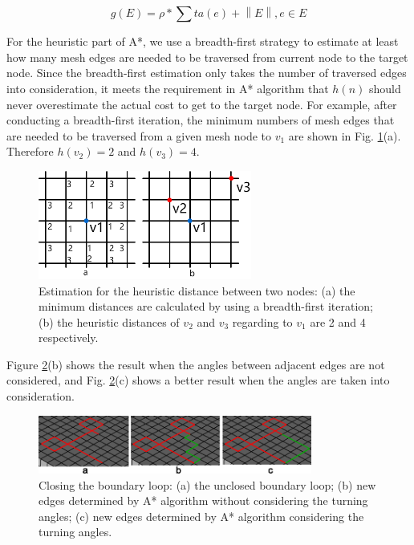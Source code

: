 \documentclass[final,5p,times,twocolumn]{elsarticle}
\begin{document}
\begin{equation}
\label{equ:det_part}
g(E) = \rho * \sum ta(e) + \left \| E \right \|, e \in E
\end{equation}

For the heuristic part of A*, we use a breadth-first strategy to estimate at least how many mesh edges are needed to be traversed from current node to the target node. Since the breadth-first estimation only takes the number of traversed edges into consideration, it meets the requirement in A* algorithm that $h(n)$ should never overestimate the actual cost to get to the target node. For example, after conducting a breadth-first iteration, the minimum numbers of mesh edges that are needed to be traversed from a given mesh node to $v_1$ are shown in Fig. \ref{fig:A_start_estimation}(a). Therefore $h(v_2)=2$ and $h(v_3)=4$.

\begin{figure}[htbp]
\begin{center}
\includegraphics[width=7cm]{A_start_estimation.png}
\caption{Estimation for the heuristic distance between two nodes: (a) the minimum distances are calculated by using a breadth-first iteration; (b) the heuristic distances of $v_2$ and $v_3$ regarding to $v_1$ are 2 and 4 respectively.}
\label{fig:A_start_estimation}
\end{center}
\end{figure}

Figure \ref{fig:close_loop}(b) shows the result when the angles between adjacent edges are not considered, and Fig. \ref{fig:close_loop}(c) shows a better result when the angles are taken into consideration.

\begin{figure}[htbp]
\begin{center}
\includegraphics[width=9cm]{close_loop.png}
\caption{Closing the boundary loop: (a) the unclosed boundary loop; (b) new edges determined by A* algorithm without considering the turning angles; (c) new edges determined by A* algorithm considering the turning angles.}
\label{fig:close_loop}
\end{center}
\end{figure}
\end{document}
